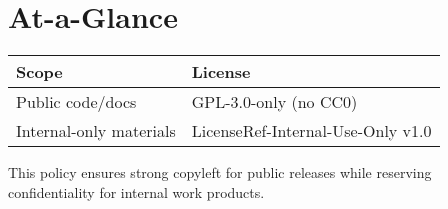 \documentclass[11pt]{article}
\begin{document}
\section*{At-a-Glance}
\begin{center}
\begin{tabular}{ll}
Scope & License \\
\hline
Public code/docs & GPL-3.0-only (no CC0) \\
Internal-only materials & LicenseRef-Internal-Use-Only v1.0 \\
\end{tabular}
\end{center}

\bigskip
\noindent This policy ensures strong copyleft for public releases while reserving confidentiality for internal work products.
\end{document}
